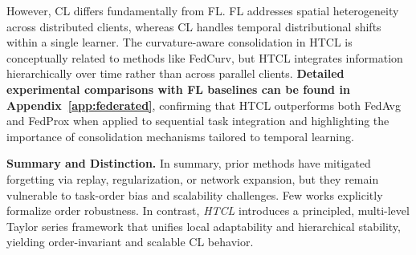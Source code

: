 However, CL differs fundamentally  from FL. FL addresses spatial heterogeneity across distributed clients, whereas CL handles temporal distributional shifts within a single learner. The curvature-aware consolidation in HTCL is conceptually related to methods like FedCurv, but HTCL integrates information hierarchically over time rather than across parallel clients. \textbf{Detailed experimental comparisons with FL baselines can be found in Appendix~\ref{app:federated}}, confirming that HTCL outperforms both FedAvg and FedProx when applied to sequential task integration and highlighting the importance of consolidation mechanisms tailored to temporal learning.

\textbf{Summary and Distinction.}
In summary, prior methods have mitigated forgetting via replay, regularization, or network expansion, but they remain vulnerable to task-order bias and scalability challenges. Few works explicitly formalize order robustness. In contrast, \emph{HTCL} introduces a principled, multi-level Taylor series framework that unifies local adaptability and hierarchical stability, yielding order-invariant and scalable CL behavior.